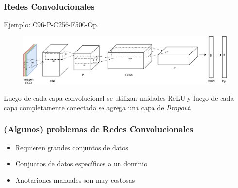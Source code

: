 \documentclass{beamer}
\begin{document}
\begin{frame}
\frametitle{Redes Convolucionales}
Ejemplo: C96-P-C256-F500-Op.
\vfill
\begin{figure}
    \centering
    \includegraphics[width=\textwidth]{images/net_example.pdf}
\end{figure}
\vfill
Luego de cada capa convolucional se utilizan unidades ReLU y luego de cada capa completamente conectada se agrega una capa de \textit{Dropout}.
\vfill
\end{frame}




\begin{frame}
\frametitle{(Algunos) problemas de Redes Convolucionales}
\begin{itemize}
    \item Requieren grandes conjuntos de datos
    \item Conjuntos de datos específicos a un dominio
    \item Anotaciones manuales son muy costosas
\end{itemize}
\end{frame}
\end{document}
